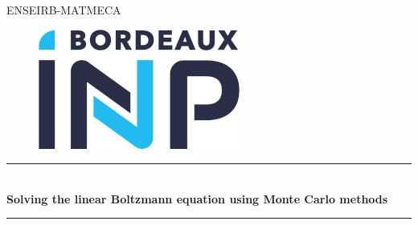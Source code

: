 \documentclass[a4paper, 11pt]{article}
\begin{document}
 
	
	
	
	\begin{titlepage} %
		\newcommand{\HRule}{\rule{\linewidth}{0.5mm}} %
		
		\centering %
		
		
		\textsc{\LARGE ENSEIRB-MATMECA}\\[1cm] %
		
		
		\begin{figure}[H]
			\begin{center}
				\includegraphics[scale=4]{logo ecole.jpg}
			\end{center}
		\end{figure}
		
		
		
		\vspace{1cm}
		
		\HRule\\[0.4cm]
		
		{\huge\bfseries Solving the linear Boltzmann equation using Monte Carlo methods }\\[0.4cm] %
		
		\HRule\\[1.5cm]
		
		{\huge\bfseries }
		

\end{titlepage}
\end{document}
